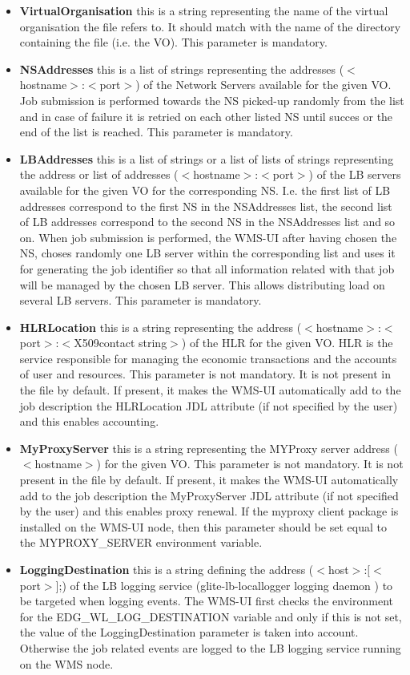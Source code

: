 \begin{itemize}
 \item \textbf{VirtualOrganisation} this is a string representing the name of the virtual organisation the file refers to.
   It should match with the name of the directory containing the file (i.e. the VO). This parameter is 
   mandatory. 
 \item \textbf{NSAddresses} this is a list of strings representing the addresses ($<$hostname$>$:$<$port$>$) of the Network 
   Servers available for the given VO. Job submission is performed towards the NS picked-up randomly from 
   the list and in case of failure it is retried on each other listed NS until succes or the end of the 
   list is reached. This parameter is mandatory.
 \item \textbf{LBAddresses} this is a list of strings or a list of lists of strings representing the address or list 
   of addresses ($<$hostname$>$:$<$port$>$) of the LB servers available for the given VO for the corresponding NS. 
   I.e. the first list of LB addresses correspond to the first NS in the NSAddresses list, the second list 
   of LB addresses correspond to the second NS in the NSAddresses list and so on.
   When job submission is performed, the WMS-UI after having chosen the NS, choses randomly one LB server within
   the corresponding list and uses it for generating the job identifier so that all information related with 
   that job will be managed by the chosen LB server. This allows distributing load on several LB servers.  
   This parameter is mandatory.
 \item \textbf{HLRLocation} this is a string representing the address ($<$hostname$>$:$<$port$>$:$<$X509contact string$>$)  of the 
   HLR for the given VO. HLR is the service responsible for managing the economic transactions and the 
   accounts of user and resources. This parameter is not mandatory. It is not present in the file by default.
   If present, it makes the WMS-UI automatically add to the job description the HLRLocation JDL attribute 
   (if not specified by the user) and this enables accounting.
 \item \textbf{MyProxyServer} this is a string representing the MYProxy server address ($<$hostname$>$) for the given VO. 
   This parameter is not mandatory. It is not present in the file by default. If present, it makes the WMS-UI 
   automatically add to the job description the MyProxyServer JDL attribute (if not specified by the user) 
   and this enables proxy renewal. If the myproxy client package is installed on the WMS-UI node, then this 
   parameter should be set equal to the MYPROXY\_SERVER environment variable.
 \item \textbf{LoggingDestination} this is a string defining the address ($<$host$>$:$[<$port$>]$;) of the LB logging service 
   (glite-lb-locallogger logging daemon ) to be targeted when logging events. The WMS-UI first checks the 
   environment for the EDG\_WL\_LOG\_DESTINATION variable and only if this is not set, the value of the 
   LoggingDestination parameter is taken into account. Otherwise the job related events are logged to the 
   LB logging service running on the WMS node.

\end{itemize}
\smallskip

